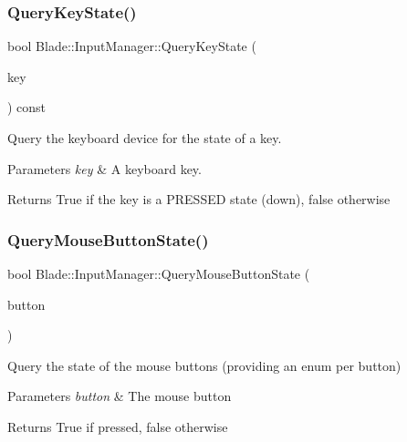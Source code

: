 \subsubsection{\texorpdfstring{Query\+Key\+State()}{QueryKeyState()}}
{\footnotesize\ttfamily bool Blade\+::\+Input\+Manager\+::\+Query\+Key\+State (\begin{DoxyParamCaption}\item[{\hyperlink{namespace_blade_a15d9bde4921fb2a9a953f8d97ea49d1c}{Virtual\+Key}}]{key }\end{DoxyParamCaption}) const\hspace{0.3cm}{\ttfamily [noexcept]}}



Query the keyboard device for the state of a key. 


\begin{DoxyParams}{Parameters}
{\em key} & A keyboard key. \\
\hline
\end{DoxyParams}
\begin{DoxyReturn}{Returns}
True if the key is a P\+R\+E\+S\+S\+ED state (down), false otherwise 
\end{DoxyReturn}
\mbox{\label{class_blade_1_1_input_manager_ad2537487a4c3c80e7eb6b8c0ea37b09b}} 
\subsubsection{\texorpdfstring{Query\+Mouse\+Button\+State()}{QueryMouseButtonState()}}
{\footnotesize\ttfamily bool Blade\+::\+Input\+Manager\+::\+Query\+Mouse\+Button\+State (\begin{DoxyParamCaption}\item[{Mouse\+Button}]{button }\end{DoxyParamCaption})}



Query the state of the mouse buttons (providing an enum per button) 


\begin{DoxyParams}{Parameters}
{\em button} & The mouse button \\
\hline
\end{DoxyParams}
\begin{DoxyReturn}{Returns}
True if pressed, false otherwise 
\end{DoxyReturn}
\mbox{\label{class_blade_1_1_input_manager_ab1fe795118afeb4642342567d3e27b3f}} 
